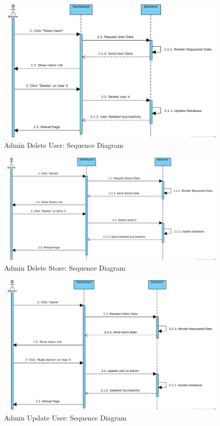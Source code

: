 \begin{figure}[H]
    \centering
    \includegraphics[width = \linewidth]{media/Sequence/Admin_Delete_User.png}
	\caption{Admin Delete User: Sequence Diagram}
	\label{fig:Admin_Delete_User}
\end{figure}

\begin{figure}[H]
    \centering
    \includegraphics[width = \linewidth]{media/Sequence/Admin_Delete_Store.png}
	\caption{Admin Delete Store: Sequence Diagram}
	\label{fig:Admin_Delete_Store}
\end{figure}


\begin{figure}[H]
    \centering
    \includegraphics[width = \linewidth]{media/Sequence/Admin_Update_User.png}
	\caption{Admin Update User: Sequence Diagram}
	\label{fig:Admin_Update_User}
\end{figure}